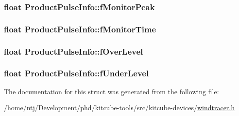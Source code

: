 \hypertarget{structProductPulseInfo_af58303a59fde2922eb2080d7917bad0c}{
\subsubsection[{f\-Monitor\-Peak}]{\setlength{\rightskip}{0pt plus 5cm}float Product\-Pulse\-Info\-::f\-Monitor\-Peak}}\label{structProductPulseInfo_af58303a59fde2922eb2080d7917bad0c}
\hypertarget{structProductPulseInfo_a1f8a1cf26e1708ac73d110597b174c0a}{
\subsubsection[{f\-Monitor\-Time}]{\setlength{\rightskip}{0pt plus 5cm}float Product\-Pulse\-Info\-::f\-Monitor\-Time}}\label{structProductPulseInfo_a1f8a1cf26e1708ac73d110597b174c0a}
\hypertarget{structProductPulseInfo_a7e101db9e9982b6e69660e798c557eeb}{
\subsubsection[{f\-Over\-Level}]{\setlength{\rightskip}{0pt plus 5cm}float Product\-Pulse\-Info\-::f\-Over\-Level}}\label{structProductPulseInfo_a7e101db9e9982b6e69660e798c557eeb}
\hypertarget{structProductPulseInfo_a0abe1437dacaa329d16026ecd00c171f}{
\subsubsection[{f\-Under\-Level}]{\setlength{\rightskip}{0pt plus 5cm}float Product\-Pulse\-Info\-::f\-Under\-Level}}\label{structProductPulseInfo_a0abe1437dacaa329d16026ecd00c171f}


The documentation for this struct was generated from the following file\-:\begin{DoxyCompactItemize}
\item 
/home/ntj/\-Development/phd/kitcube-\/tools/src/kitcube-\/devices/\hyperlink{windtracer_8h}{windtracer.\-h}\end{DoxyCompactItemize}
